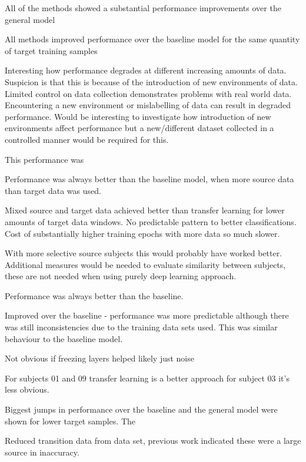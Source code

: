 All of the methods showed a substantial performance improvements over the general model

All methods improved performance over the baseline model for the same quantity of target training samples

Interesting how performance degrades at different increasing amounts of data. Suspicion is that this is because of the introduction of new environments of data. Limited control on data collection demonstrates problems with real world data. Encountering a new environment or mislabelling of data can result in degraded performance. Would be interesting to investigate how introduction of new environments affect performance but a new/different dataset collected in a controlled manner would be required for this.

This performance was 

Performance was always better than the baseline model, when more source data than target data was used.

Mixed source and target data achieved better than transfer learning for lower amounts of target data windows. No predictable pattern to better classifications. Cost of substantially higher training epochs with more data so much slower.

With more selective source subjects this would probably have worked better. Additional measures would be needed to evaluate similarity between subjects, these are not needed when using purely deep learning approach.

Performance was always better than the baseline.

Improved over the baseline - performance was more predictable although there was still inconsistencies due to the training data sets used. This was similar behaviour to the baseline model.

Not obvious if freezing layers helped likely just noise


For subjects 01 and 09 transfer learning is a better approach for subject 03 it's less obvious.

Biggest jumps in performance over the baseline and the general model were shown for lower target samples. The 

Reduced transition data from data set, previous work indicated these were a large source in inaccuracy.

